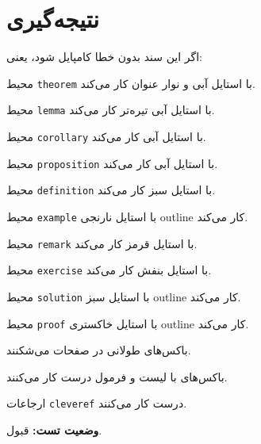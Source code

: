 \documentclass{matinbook}
\begin{document}
\section{نتیجه‌گیری}
\label{sec:conclusion}

اگر این سند بدون خطا کامپایل شود، یعنی:

محیط \texttt{theorem} با استایل آبی و نوار عنوان کار می‌کند.

محیط \texttt{lemma} با استایل آبی تیره‌تر کار می‌کند.

محیط \texttt{corollary} با استایل آبی کار می‌کند.

محیط \texttt{proposition} با استایل آبی کار می‌کند.

محیط \texttt{definition} با استایل سبز کار می‌کند.

محیط \texttt{example} با استایل نارنجی outline کار می‌کند.

محیط \texttt{remark} با استایل قرمز کار می‌کند.

محیط \texttt{exercise} با استایل بنفش کار می‌کند.

محیط \texttt{solution} با استایل سبز outline کار می‌کند.

محیط \texttt{proof} با استایل خاکستری outline کار می‌کند.

باکس‌های طولانی در صفحات می‌شکنند.

باکس‌های با لیست و فرمول درست کار می‌کنند.

ارجاعات \texttt{cleveref} درست کار می‌کنند.

\textbf{وضعیت تست:} قبول.
\end{document}
